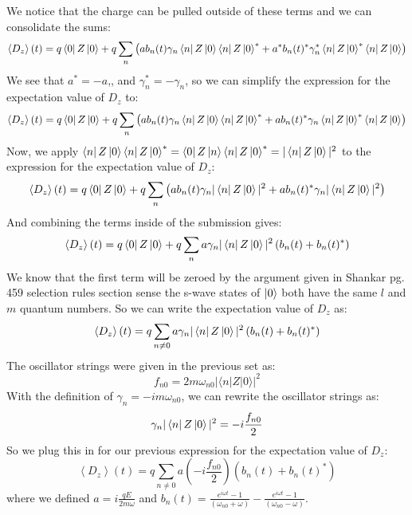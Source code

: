 \documentclass[12pt]{article}
\begin{document}
We notice that the charge can be pulled outside of these terms and we can consolidate the sums:
\begin{equation}
\left\langle D_{z}\right\rangle(t) = q\bra{0}Z\ket{0} + q\sum_{n} \left( a b_n(t) \gamma _{n} \bra{n} Z\ket{0} \bra{n}Z\ket{0}^* + a^* b_n(t)^* \gamma _{n}^* \bra{n}Z\ket{0}^* \bra{n}Z\ket{0} \right)
\end{equation}
We see that $a^* = -a$,, and $\gamma _{n}^* = -\gamma _{n}$, so we can simplify the expression for the expectation value of $D_z$ to:
\begin{equation}
\left\langle D_{z}\right\rangle(t) = q\bra{0}Z\ket{0} + q\sum_{n} \left( a b_n(t) \gamma _{n} \bra{n} Z\ket{0} \bra{n}Z\ket{0}^* + a b_n(t)^* \gamma _{n} \bra{n}Z\ket{0}^* \bra{n}Z\ket{0} \right)
\end{equation}
Now, we apply $\bra{n}Z\ket{0} \bra{n}Z\ket{0}^{*} = \bra{0}Z\ket{n} \bra{n}Z\ket{0}^{*} = |\bra{n}Z\ket{0}|^2$ to the expression for the expectation value of $D_z$:
\begin{equation}
\left\langle D_{z}\right\rangle(t) = q\bra{0}Z\ket{0} + q\sum_{n} \left( a b_n(t) \gamma _{n} |\bra{n}Z\ket{0}|^2 + a b_n(t)^* \gamma _{n} |\bra{n}Z\ket{0}|^2 \right)
\end{equation}
And combining the terms inside of the submission gives:
\begin{equation}
\left\langle D_{z}\right\rangle(t) = q\bra{0}Z\ket{0} + q\sum_{n} a \gamma _{n} |\bra{n}Z\ket{0}|^2 \left( b_n(t) + b_n(t)^* \right)
\end{equation}
We know that the first term will be zeroed by the argument given in Shankar pg. 459 selection rules section sense the s-wave states of $\ket{0}$ both have the same $l$ and $m$ quantum numbers. So we can write the expectation value of $D_z$ as:
\begin{equation}
\left\langle D_{z}\right\rangle(t) = q\sum_{n \neq 0} a \gamma _{n} |\bra{n}Z\ket{0}|^2 \left( b_n(t) + b_n(t)^* \right)
\end{equation}
The oscillator strings were given in the previous set as:
\begin{equation}
  f_{n 0}=2 m \omega_{n 0}|\langle n|Z| 0\rangle|^{2}
\end{equation}
With the definition of $\gamma _{n} = -i m \omega_{n 0}$, we can rewrite the oscillator strings as:
\begin{equation}
\gamma _{n} |\bra{n}Z\ket{0}|^2 = -i \frac{f_{n 0}}{2}
\end{equation}
So we plug this in for our previous expression for the expectation value of $D_z$:
\begin{equation}
\left\langle D_{z}\right\rangle(t) = q\sum_{n \neq 0} a \left( -i \frac{f_{n 0}}{2} \right) \left( b_n(t) + b_n(t)^* \right)
\end{equation}
where we defined $a = i \frac{q E}{2m \omega}$ and $b_n(t)=  \frac{e^{i \omega t} - 1}{(\omega _{n0} + \omega)} - \frac{e^{i \omega t} - 1}{(\omega _{n0} - \omega)}$.
\end{document}
